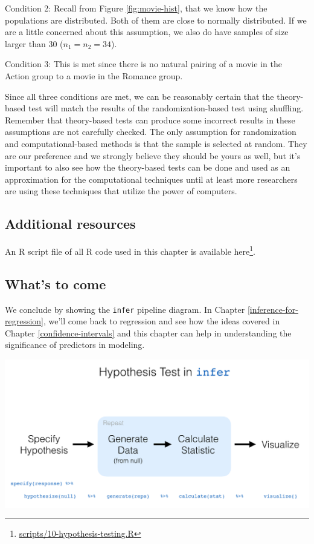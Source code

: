 \documentclass[12pt, krantz2,]{krantz}
\renewcommand{\href}[2]{#2\footnote{\url{#1}}}
\begin{document}
Condition 2: Recall from Figure \ref{fig:movie-hist}, that we know how the populations are distributed. Both of them are close to normally distributed. If we are a little concerned about this assumption, we also do have samples of size larger than 30 (\(n_1 = n_2 = 34\)).

Condition 3: This is met since there is no natural pairing of a movie in the Action group to a movie in the Romance group.

Since all three conditions are met, we can be reasonably certain that the theory-based test will match the results of the randomization-based test using shuffling. Remember that theory-based tests can produce some incorrect results in these assumptions are not carefully checked. The only assumption for randomization and computational-based methods is that the sample is selected at random. They are our preference and we strongly believe they should be yours as well, but it's important to also see how the theory-based tests can be done and used as an approximation for the computational techniques until at least more researchers are using these techniques that utilize the power of computers.

\hypertarget{additional-resources-7}{%
\subsection{Additional resources}\label{additional-resources-7}}

An R script file of all R code used in this chapter is available \href{scripts/10-hypothesis-testing.R}{here}.

\hypertarget{whats-to-come-8}{%
\subsection{What's to come}\label{whats-to-come-8}}

We conclude by showing the \texttt{infer} pipeline diagram. In Chapter \ref{inference-for-regression}, we'll come back to regression and see how the ideas covered in Chapter \ref{confidence-intervals} and this chapter can help in understanding the significance of predictors in modeling.

\begin{center}\includegraphics[width=\textwidth]{images/flowcharts/infer/ht_diagram} \end{center}
\end{document}

